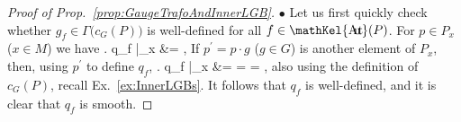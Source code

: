 \documentclass[a4paper,oneside,11pt,bibliography=totoc]{scrartcl}
\DeclareMathOperator{\sAut}{\mathKel{A\mkern-5.5mu u\mkern-4mu t\mkern-1.5mu}}
\def\bas#1\eas{\begin{align*}#1\end{align*}}
\theoremstyle{plain}
\theoremstyle{remark}
\theoremstyle{definition}
\begin{document}
\begin{proof}[Proof of Prop.\ \ref{prop:GaugeTrafoAndInnerLGB}]
\leavevmode\newline
\indent $\bullet$ Let us first quickly check whether $g_f \in \Gamma\bigl( c_G(P) \bigr)$ is well-defined for all $f \in \sAut(P)$. For $p \in P_x$ ($x \in M$) we have
\bas
\mleft. q_f \mright|_x
&=
,
\eas
If $p^\prime = p \cdot g$ ($g \in G$) is another element of $P_x$, then, using $p^\prime$ to define $q_f$,
\bas
\mleft. q_f \mright|_x
&=
=
=
,
\eas
also using the definition of $c_G(P)$, recall Ex.\ \ref{ex:InnerLGBs}. It follows that $q_f$ is well-defined, and it is clear that $q_f$ is smooth.


\end{proof}
\end{document}
